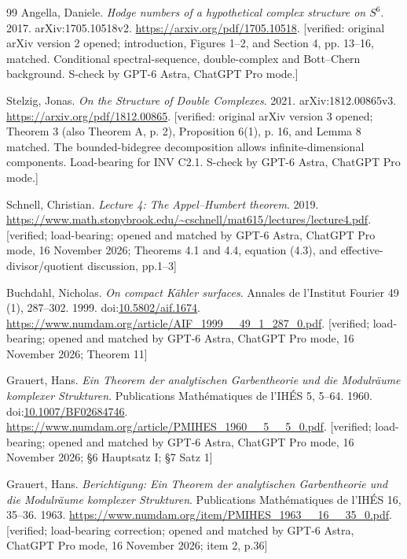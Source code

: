 \documentclass[11pt,a4paper]{article}
\theoremstyle{plain}
\theoremstyle{definition}
\begin{document}
\begin{thebibliography}{99}
Angella, Daniele. \emph{Hodge numbers of a hypothetical complex structure on $S^6$}. 2017. arXiv:1705.10518v2. \url{https://arxiv.org/pdf/1705.10518}. [verified: original arXiv version 2 opened; introduction, Figures 1--2, and Section 4, pp. 13--16, matched. Conditional spectral-sequence, double-complex and Bott--Chern background. S-check by GPT-6 Astra, ChatGPT Pro mode.]

Stelzig, Jonas. \emph{On the Structure of Double Complexes}. 2021. arXiv:1812.00865v3. \url{https://arxiv.org/pdf/1812.00865}. [verified: original arXiv version 3 opened; Theorem 3 (also Theorem A, p. 2), Proposition 6(1), p. 16, and Lemma 8 matched. The bounded-bidegree decomposition allows infinite-dimensional components. Load-bearing for INV C2.1. S-check by GPT-6 Astra, ChatGPT Pro mode.]

Schnell, Christian. \emph{Lecture 4: The {Appel--Humbert} theorem}. 2019. \url{https://www.math.stonybrook.edu/~cschnell/mat615/lectures/lecture4.pdf}. [verified; load-bearing; opened and matched by GPT-6 Astra, ChatGPT Pro mode, 16 November 2026; Theorems 4.1 and 4.4, equation (4.3), and effective-divisor/quotient discussion, pp.1--3]

Buchdahl, Nicholas. \emph{On compact Kähler surfaces}. Annales de l'Institut Fourier 49 (1), 287--302. 1999. doi:\url{10.5802/aif.1674}. \url{https://www.numdam.org/article/AIF_1999__49_1_287_0.pdf}. [verified; load-bearing; opened and matched by GPT-6 Astra, ChatGPT Pro mode, 16 November 2026; Theorem 11]

Grauert, Hans. \emph{Ein Theorem der analytischen Garbentheorie und die Modulräume komplexer Strukturen}. Publications Mathématiques de l'IHÉS 5, 5--64. 1960. doi:\url{10.1007/BF02684746}. \url{https://www.numdam.org/article/PMIHES_1960__5__5_0.pdf}. [verified; load-bearing; opened and matched by GPT-6 Astra, ChatGPT Pro mode, 16 November 2026; \S6 Hauptsatz I; \S7 Satz 1]

Grauert, Hans. \emph{Berichtigung: Ein Theorem der analytischen Garbentheorie und die Modulräume komplexer Strukturen}. Publications Mathématiques de l'IHÉS 16, 35--36. 1963. \url{https://www.numdam.org/item/PMIHES_1963__16__35_0.pdf}. [verified; load-bearing correction; opened and matched by GPT-6 Astra, ChatGPT Pro mode, 16 November 2026; item 2, p.36]


\end{thebibliography}
\end{document}
